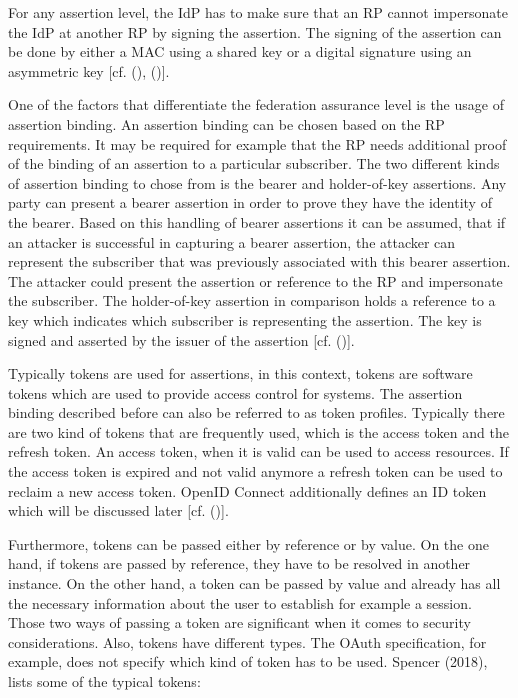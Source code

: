 For any assertion level, the IdP has to make sure that an RP cannot impersonate the IdP at another RP by signing the assertion. The signing of the assertion can be done by either a MAC using a shared key or a digital signature using an asymmetric key [cf. (\cite{NIST:2017:DIG}), (\cite{NIST:2017:DIGFA})].  

One of the factors that differentiate the federation assurance level is the usage of assertion binding. An assertion binding can be chosen based on the RP requirements. It may be required for example that the RP needs additional proof of the binding of an assertion to a particular subscriber. The two different kinds of assertion binding to chose from is the bearer and holder-of-key assertions. Any party can present a bearer assertion in order to prove they have the identity of the bearer. Based on this handling of bearer assertions it can be assumed, that if an attacker is successful in capturing a bearer assertion, the attacker can represent the subscriber that was previously associated with this bearer assertion. The attacker could present the assertion or reference to the RP and impersonate the subscriber. The holder-of-key assertion in comparison holds a reference to a key which indicates which subscriber is representing the assertion. The key is signed and asserted by the issuer of the assertion [cf. (\cite{NIST:2017:DIGFA})].

Typically tokens are used for assertions, in this context, tokens are software tokens which are used to provide access control for systems. The assertion binding described before can also be referred to as token profiles. Typically there are two kind of tokens that are frequently used, which is the access token and the refresh token. An access token, when it is valid can be used to access resources. If the access token is expired and not valid anymore a refresh token can be used to reclaim a new access token. OpenID Connect additionally defines an ID token which will be discussed later [cf. (\cite{Spencer:2018:APISecurity})]. 

Furthermore, tokens can be passed either by reference or by value. On the one hand, if tokens are passed by reference, they have to be resolved in another instance. On the other hand, a token can be passed by value and already has all the necessary information about the user to establish for example a session. Those two ways of passing a token are significant when it comes to security considerations. Also, tokens have different types. The OAuth specification, for example, does not specify which kind of token has to be used. Spencer (2018), lists some of the typical tokens: 

